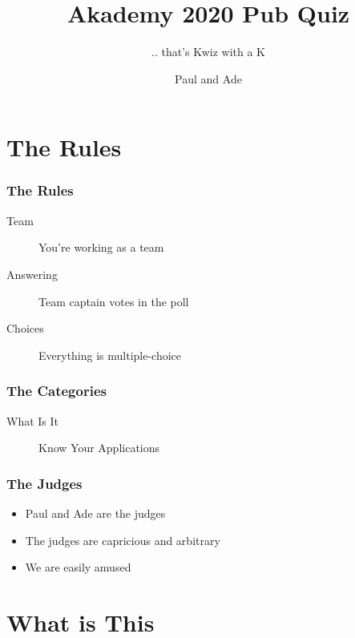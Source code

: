 \documentclass[t,compress,aspectratio=169]{beamer}
\title{Akademy 2020 Pub Quiz}
\subtitle{.. that's Kwiz with a K}
\author{Paul and Ade}
\begin{document}
\begin{withoutheadline}
\begin{frame}
\titlepage
\end{frame}
\end{withoutheadline}

\section{The Rules}

\begin{frame}
    \frametitle{The Rules}
    \begin{description}
        \item[Team] You're working as a team
        \pause
        \item[Answering] Team captain votes in the poll
        \pause
        \item[Choices] Everything is multiple-choice
    \end{description}
\end{frame}

\begin{frame}
    \frametitle{The Categories}
    \begin{description}
        \item[What Is It] Know Your Applications
    \end{description}
\end{frame}

\begin{frame}
    \frametitle{The Judges}
    \begin{itemize}
        \item Paul and Ade are the judges
        \item The judges are capricious and arbitrary
        \item We are easily amused
    \end{itemize}
\end{frame}



\section{What is This}
\end{document}
